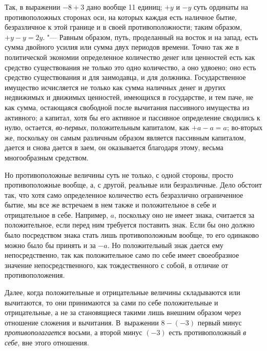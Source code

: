 Так, в выражении $-8+3$ дано вообще 11 единиц; $+y$ и $-y$ суть
ординаты на противоположных сторонах оси, на которых каждая есть наличное
бытие, безразличное к этой границе и в своей противоположности; таким
образом, $+y-y=2y$. "--- Равным образом, путь,
проделанный на восток и на запад, есть
сумма двойного усилия или сумма двух периодов времени. Точно так же в
политической экономии определенное количество денег или ценностей есть как
средство существования не только это одно количество, а оно удвоено; оно
есть средство существования и для заимодавца, и для должника.
Государственное имущество исчисляется не только как сумма наличных денег и
других недвижимых и движимых ценностей, имеющихся в государстве, и тем
паче, не как сумма, остающаяся свободной после вычитания пассивного
имущества из активного; а капитал, хотя бы его активное и пассивное
определение сводились к нулю, остается,
{\em во-первых}, положительным капиталом, как $+a-a=a$;
во-вторых же, поскольку он самым различным образом является пассивным
капиталом, дается и снова дается в заем, он оказывается благодаря этому,
весьма многообразным средством.

Но противоположные величины суть не только, с одной стороны, просто
противоположные вообще, а, с другой, реальные или безразличные. Дело
обстоит так, что хотя само определенное количество есть безразлично
ограниченное бытие, мы все же встречаем в нем также и положительное в себе
и отрицательное в себе. Например, $a$, поскольку
оно не имеет знака, считается за положительное, если перед ним требуется
поставить знак. Если бы оно должно было посредством знака стать лишь
противоположным вообще, то его одинаково можно было бы принять и за
$-a$. Но положительный знак дается ему
непосредственно, так как положительное само по себе имеет своеобразное
значение непосредственного, как тождественного с собой, в отличие от
противоположения.

Далее, когда положительные и отрицательные величины складываются или
вычитаются, то они принимаются за сами по себе положительные и
отрицательные, а не за становящиеся такими лишь внешним образом через
отношение сложения и вычитания. В~выражении $8-(-3)$ первый минус
{\em противополагается} восьми, а второй минус $(-3)$
есть противоположный {\em в себе}, вне этого отношения.

